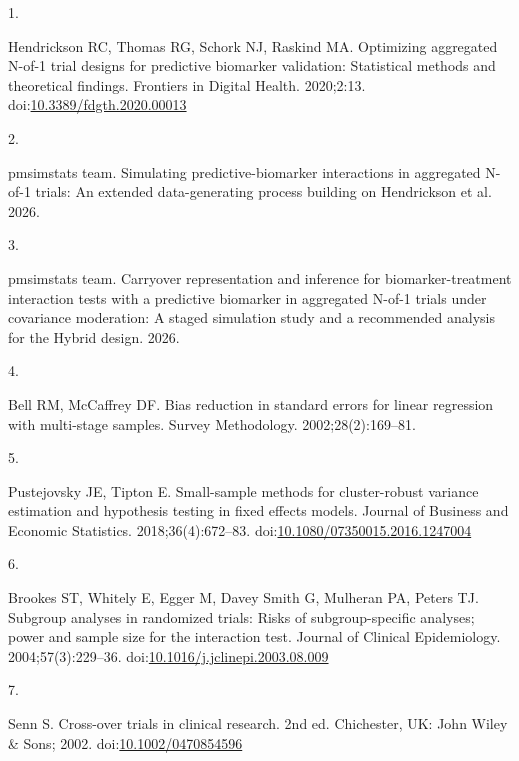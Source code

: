 \documentclass[
  11pt,
]{article}
\newlength{\cslhangindent}
\newlength{\csllabelwidth}
\newenvironment{CSLReferences}[2] %
 {\begin{list}{}{%
  \setlength{\itemindent}{0pt}
  \setlength{\leftmargin}{0pt}
  \setlength{\parsep}{0pt}
  \ifodd #1
   \setlength{\leftmargin}{\cslhangindent}
   \setlength{\itemindent}{-1\cslhangindent}
  \fi
  \setlength{\itemsep}{#2\baselineskip}}}
 {\end{list}}
\newcommand{\CSLLeftMargin}[1]{\parbox[t]{\csllabelwidth}{\strut#1\strut}}
\newcommand{\CSLRightInline}[1]{\parbox[t]{\linewidth - \csllabelwidth}{\strut#1\strut}}
\begin{document}
\protect{}\label{refs}
\begin{CSLReferences}{0}{1}
\CSLLeftMargin{1. }%
\CSLRightInline{Hendrickson RC, Thomas RG, Schork NJ, Raskind MA. Optimizing aggregated {N}-of-1 trial designs for predictive biomarker validation: Statistical methods and theoretical findings. Frontiers in Digital Health. 2020;2:13. doi:\href{https://doi.org/10.3389/fdgth.2020.00013}{10.3389/fdgth.2020.00013}}

\CSLLeftMargin{2. }%
\CSLRightInline{{pmsimstats team}. Simulating predictive-biomarker interactions in aggregated {N}-of-1 trials: An extended data-generating process building on {Hendrickson} et al. 2026.}

\CSLLeftMargin{3. }%
\CSLRightInline{{pmsimstats team}. Carryover representation and inference for biomarker-treatment interaction tests with a predictive biomarker in aggregated {N}-of-1 trials under covariance moderation: A staged simulation study and a recommended analysis for the {Hybrid} design. 2026.}

\CSLLeftMargin{4. }%
\CSLRightInline{Bell RM, McCaffrey DF. Bias reduction in standard errors for linear regression with multi-stage samples. Survey Methodology. 2002;28(2):169--81.}

\CSLLeftMargin{5. }%
\CSLRightInline{Pustejovsky JE, Tipton E. Small-sample methods for cluster-robust variance estimation and hypothesis testing in fixed effects models. Journal of Business and Economic Statistics. 2018;36(4):672--83. doi:\href{https://doi.org/10.1080/07350015.2016.1247004}{10.1080/07350015.2016.1247004}}

\CSLLeftMargin{6. }%
\CSLRightInline{Brookes ST, Whitely E, Egger M, Davey Smith G, Mulheran PA, Peters TJ. Subgroup analyses in randomized trials: Risks of subgroup-specific analyses; power and sample size for the interaction test. Journal of Clinical Epidemiology. 2004;57(3):229--36. doi:\href{https://doi.org/10.1016/j.jclinepi.2003.08.009}{10.1016/j.jclinepi.2003.08.009}}

\CSLLeftMargin{7. }%
\CSLRightInline{Senn S. Cross-over trials in clinical research. 2nd ed. Chichester, UK: John Wiley \& Sons; 2002. doi:\href{https://doi.org/10.1002/0470854596}{10.1002/0470854596}}


\end{CSLReferences}
\end{document}
